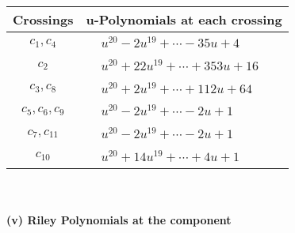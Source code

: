 \documentclass[1p]{elsarticle_modified}
\theoremstyle{definition}
\begin{document}
\begin{tabular}{m{50pt}|m{274pt}}
Crossings & \hspace{64pt}u-Polynomials at each crossing \\
\hline $$\begin{aligned}c_{1},c_{4}\end{aligned}$$&$\begin{aligned}
&u^{20}-2 u^{19}+\cdots-35 u+4
\end{aligned}$\\
\hline $$\begin{aligned}c_{2}\end{aligned}$$&$\begin{aligned}
&u^{20}+22 u^{19}+\cdots+353 u+16
\end{aligned}$\\
\hline $$\begin{aligned}c_{3},c_{8}\end{aligned}$$&$\begin{aligned}
&u^{20}+2 u^{19}+\cdots+112 u+64
\end{aligned}$\\
\hline $$\begin{aligned}c_{5},c_{6},c_{9}\end{aligned}$$&$\begin{aligned}
&u^{20}-2 u^{19}+\cdots-2 u+1
\end{aligned}$\\
\hline $$\begin{aligned}c_{7},c_{11}\end{aligned}$$&$\begin{aligned}
&u^{20}-2 u^{19}+\cdots-2 u+1
\end{aligned}$\\
\hline $$\begin{aligned}c_{10}\end{aligned}$$&$\begin{aligned}
&u^{20}+14 u^{19}+\cdots+4 u+1
\end{aligned}$\\
\hline
\end{tabular}\\~\\
\newpage\renewcommand{\arraystretch}{1}
\flushleft \textbf{(v) Riley Polynomials at the component}\newline \\
\end{document}
